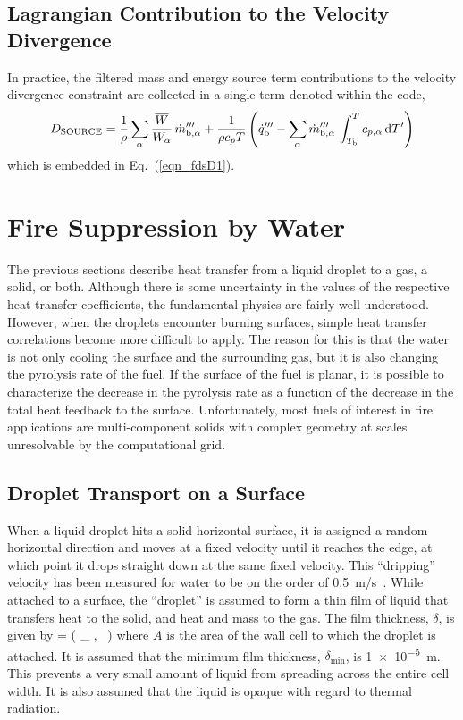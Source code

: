 \subsection{Lagrangian Contribution to the Velocity Divergence}

In practice, the filtered mass and energy source term contributions to the velocity divergence constraint are collected in a single term denoted  within the code,
\begin{equation}
D_{\si{\tiny SOURCE}} = \frac{1}{\rho} \sum_\alpha \frac{\overline{W}}{W_\alpha} \, \dot{m}_{{\rm b},\alpha}^{\ppp} + \frac{1}{\rho c_p T} \left( \dot{q}_{\rm b}^{\ppp} - \sum_\alpha \dot{m}_{{\rm b},\alpha}^{\ppp} \, \int_{T_{\rm b}}^T c_{p,\alpha} \d T'  \right)
\label{eq:D_SOURCE_vap}
\end{equation}
which is embedded in Eq.~(\ref{eqn_fdsD1}).

\section{Fire Suppression by Water}

The previous sections describe heat transfer from a liquid droplet to a gas, a solid, or both. Although there is some
uncertainty in the values of the respective heat transfer coefficients,
the fundamental physics are fairly well understood. However, when
the droplets encounter burning surfaces,
simple heat transfer correlations become more difficult to apply.
The reason for this is that the water is not only cooling the surface
and the surrounding gas, but it is also changing the pyrolysis rate
of the fuel. If the surface of the fuel is planar, it is possible
to characterize the decrease in the pyrolysis rate as a function of
the decrease in the total heat feedback to the surface. Unfortunately,
most fuels of interest in fire applications are multi-component solids
with complex geometry at scales unresolvable by the computational grid.

\subsection{Droplet Transport on a Surface}

When a liquid droplet hits a solid horizontal surface, it is assigned a
random horizontal direction and moves at a fixed velocity until it
reaches the edge, at which point it drops straight down at the same
fixed velocity. This ``dripping'' velocity has been measured for water to be on
the order of 0.5~m/s~\cite{Hamins:1,Hamins:IAFSS2002}.
While attached to a surface, the ``droplet'' is assumed to form a thin film of liquid that
transfers heat to the solid, and heat and mass to
the gas. The film thickness, $\delta$, is given by
\be
   \delta = \max \left( \delta_{\min} , \sum {} \,  \right)
\ee
where $A$ is the area of the wall cell to which the droplet is attached. It is assumed that the minimum film thickness, $\delta_{\min}$, is \SI{1e-5}{m}. This prevents a very small amount of liquid from spreading across the entire cell width. It is also assumed that the liquid is opaque with regard to thermal radiation.

